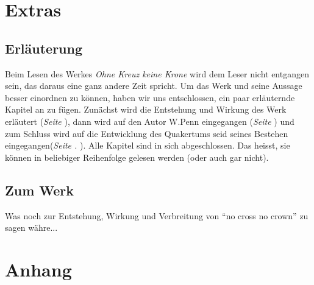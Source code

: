 \documentclass[a5paper,pagesize,9pt]{scrbook}
\begin{document}
\backmatter
\part{Extras}

\chapter{Erläuterung}

Beim Lesen des Werkes \textit{Ohne Kreuz keine Krone} wird dem Leser nicht
entgangen sein, das daraus eine ganz andere Zeit spricht. Um das Werk und seine
Aussage besser einordnen zu können, haben wir uns entschlossen, ein paar
erläuternde Kapitel an zu fügen. Zunächst wird die Entstehung und Wirkung des
Werk erläutert (\textit{Seite \pageref{ref:zum_werk}}), dann wird auf den Autor
W.Penn eingegangen (\textit{Seite \pageref{ref:zum_autor_penn}}) und zum Schluss
wird auf die Entwicklung des Quakertums seid seines Bestehen
eingegangen(\textit{Seite . \pageref{ref:entwiklung_quakertum}}). Alle Kapitel
sind in sich abgeschlossen. Das heisst, sie können in beliebiger Reihenfolge
gelesen werden (oder auch gar nicht).

\chapter{Zum Werk}\label{ref:zum_werk}

Was noch zur Entstehung, Wirkung und Verbreitung von "`no cross no crown"' zu
sagen währe...



\part{Anhang}

\printindex
\end{document}
